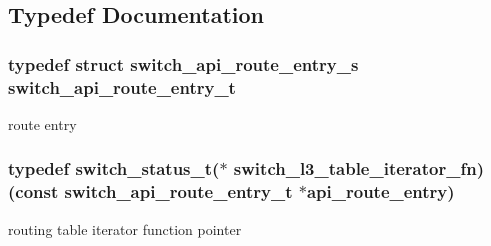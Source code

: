\subsection{Typedef Documentation}
\hypertarget{group__L3_ga969f26e2a3436107bc9b6e9f749c79b8}{
\subsubsection[{switch\+\_\+api\+\_\+route\+\_\+entry\+\_\+t}]{\setlength{\rightskip}{0pt plus 5cm}typedef struct {\bf switch\+\_\+api\+\_\+route\+\_\+entry\+\_\+s}  {\bf switch\+\_\+api\+\_\+route\+\_\+entry\+\_\+t}}}\label{group__L3_ga969f26e2a3436107bc9b6e9f749c79b8}
route entry \hypertarget{group__L3_ga0aea3e3c894c8de43078d00eaa9c263d}{
\subsubsection[{switch\+\_\+l3\+\_\+table\+\_\+iterator\+\_\+fn}]{\setlength{\rightskip}{0pt plus 5cm}typedef switch\+\_\+status\+\_\+t($\ast$ switch\+\_\+l3\+\_\+table\+\_\+iterator\+\_\+fn)(const {\bf switch\+\_\+api\+\_\+route\+\_\+entry\+\_\+t} $\ast$api\+\_\+route\+\_\+entry)}}\label{group__L3_ga0aea3e3c894c8de43078d00eaa9c263d}


routing table iterator function pointer 


